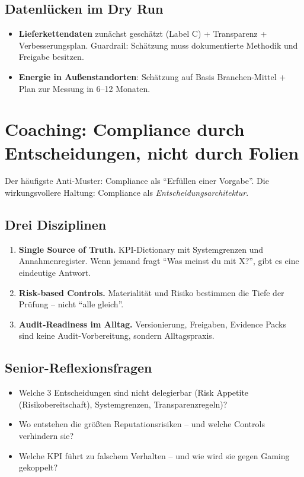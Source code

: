 \documentclass[11pt,a4paper,oneside]{article}
\begin{document}
\subsection{Datenlücken im Dry Run}

\begin{itemize}
  \item \textbf{Lieferkettendaten} zunächst geschätzt (Label C) + Transparenz + Verbesserungsplan. Guardrail: Schätzung muss dokumentierte Methodik und Freigabe besitzen.
  \item \textbf{Energie in Außenstandorten}: Schätzung auf Basis Branchen-Mittel + Plan zur Messung in 6--12 Monaten.
\end{itemize}

\section{Coaching: Compliance durch Entscheidungen, nicht durch Folien}

Der häufigste Anti-Muster: Compliance als ``Erfüllen einer Vorgabe''. Die wirkungsvollere Haltung: Compliance als \emph{Entscheidungsarchitektur}.

\subsection{Drei Disziplinen}

\begin{enumerate}
  \item \textbf{Single Source of Truth.} KPI-Dictionary mit Systemgrenzen und Annahmenregister. Wenn jemand fragt ``Was meinst du mit X?'', gibt es eine eindeutige Antwort.
  \item \textbf{Risk-based Controls.} Materialität und Risiko bestimmen die Tiefe der Prüfung -- nicht ``alle gleich''.
  \item \textbf{Audit-Readiness im Alltag.} Versionierung, Freigaben, Evidence Packs sind keine Audit-Vorbereitung, sondern Alltagspraxis.
\end{enumerate}

\subsection{Senior-Reflexionsfragen}

\begin{itemize}
  \item Welche 3 Entscheidungen sind nicht delegierbar (Risk Appetite (Risikobereitschaft), Systemgrenzen, Transparenzregeln)?
  \item Wo entstehen die größten Reputationsrisiken -- und welche Controls verhindern sie?
  \item Welche KPI führt zu falschem Verhalten -- und wie wird sie gegen Gaming gekoppelt?
\end{itemize}
\end{document}
